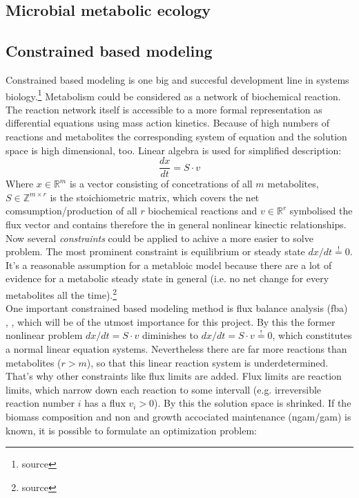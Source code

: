 \subsection{Microbial metabolic ecology}

\subsection{Constrained based modeling}
Constrained based modeling is one big and succesful development line in systems biology.\footnote{source}
Metabolism could be considered as a network of biochemical reaction.
The reaction network itself is accessible to a more formal representation as differential equations using mass action kinetics.
Because of high numbers of reactions and metabolites the corresponding system of equation and the solution space is high dimensional, too.
Linear algebra is used for simplified description:
\[
  \frac{dx}{dt}=S \cdot v
\]
Where $x\in \mathbb{R}^m$ is a vector consisting of concetrations of all $m$ metabolites, $S\in \mathbb{Z}^{m\times r}$ is the stoichiometric matrix, which covers the net comsumption/production of all $r$ biochemical reactions and $v \in \mathbb{R}^r$ symbolised the flux vector and contains therefore the in general nonlinear kinectic relationships.\\
Now several \textit{constraints} could be applied to achive a more easier to solve problem.
The most prominent constraint is equilibrium or steady state $dx/dt \stackrel{!}{=}0$.
It's a reasonable assumption for a metabloic model because there are a lot of evidence for a metabolic steady state in general (i.e. no net change for every metabolites all the time).\footnote{source}\\
One important constrained based modeling method is flux balance analysis (fba) \cite{Varma1994}, \cite{Orth2010}, which will be of the utmost importance for this project.
By this the former nonlinear problem $dx/dt=S\cdot v$ diminishes to $dx/dt=S\cdot v \stackrel{!}{=}0$, which constitutes a normal linear equation systems.
Nevertheless there are far more reactions than metabolites ($r>m$), so that this linear reaction system is underdetermined.
That's why other constraints like flux limits are added.
Flux limits are reaction limits, which narrow down each reaction to some intervall (e.g. irreversible reaction number $i$ has a flux $v_i>0$).
By this the solution space is shrinked.
If the biomass composition and non and growth accociated maintenance (ngam/gam) is known, it is possible to formulate an optimization problem:
